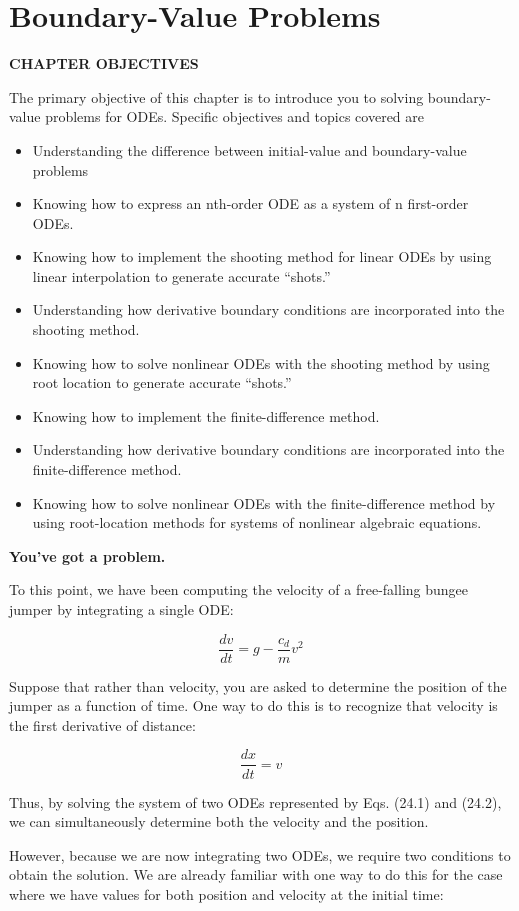 \documentclass[../main.tex]{subfiles}
\begin{document}
\chapter{Boundary-Value Problems}

\begin{center}
    \Large{\textbf{CHAPTER OBJECTIVES}}
\end{center}
The primary objective of this chapter is to introduce you to solving boundary-value
problems for ODEs. Specific objectives and topics covered are
\begin{itemize}
    \item Understanding the difference between initial-value and boundary-value problems
    \item Knowing how to express an nth-order ODE as a system of n first-order ODEs.
    \item Knowing how to implement the shooting method for linear ODEs by using linear
    interpolation to generate accurate ``shots.''
    \item Understanding how derivative boundary conditions are incorporated into the
    shooting method.
    \item Knowing how to solve nonlinear ODEs with the shooting method by using root
    location to generate accurate ``shots.''
    \item Knowing how to implement the finite-difference method.
    \item Understanding how derivative boundary conditions are incorporated into the
    finite-difference method.
    \item Knowing how to solve nonlinear ODEs with the finite-difference method by using
    root-location methods for systems of nonlinear algebraic equations.
\end{itemize}

\newpage

\large{\textbf{You've got a problem.}}

\noindent To this point, we have been computing the velocity of a free-falling bungee jumper by
integrating a single ODE:

\begin{equation}
    \tag{24.1}
    \frac{d v}{d t}=g-\frac{c_{d}}{m} v^{2}
\end{equation}

Suppose that rather than velocity, you are asked to determine the position of the jumper as
a function of time. One way to do this is to recognize that velocity is the first derivative of distance:

\begin{equation}
    \tag{24.2}
    \frac{dx}{dt} = v
\end{equation}

\noindent Thus, by solving the system of two ODEs represented by Eqs. (24.1) and (24.2), we can
simultaneously determine both the velocity and the position.

However, because we are now integrating two ODEs, we require two conditions to
obtain the solution. We are already familiar with one way to do this for the case where we
have values for both position and velocity at the initial time:
\end{document}
